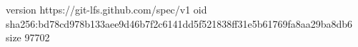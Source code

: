 version https://git-lfs.github.com/spec/v1
oid sha256:bd78cd978b133aee9d46b7f2c6141dd5f521838ff31e5b61769fa8aa29ba8db6
size 97702
